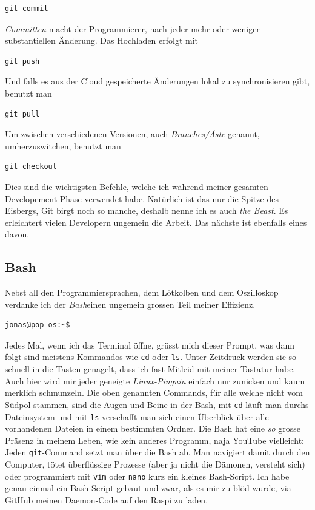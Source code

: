 \documentclass[12pt,titlepage,a4paper]{article}
\begin{document}
\begin{verbatim}
git commit 
\end{verbatim}
\textit{Committen} macht der Programmierer, nach jeder mehr oder weniger substantiellen Änderung. Das Hochladen erfolgt mit
\begin{verbatim}
git push
\end{verbatim}
Und falls es aus der Cloud gespeicherte Änderungen lokal zu synchronisieren gibt, benutzt man
\begin{verbatim}
git pull
\end{verbatim}
Um zwischen verschiedenen Versionen, auch \textit{Branches/Äste} genannt, umherzuswitchen, benutzt man
\begin{verbatim}
git checkout
\end{verbatim}
Dies sind die wichtigsten Befehle, welche ich während meiner gesamten Developement-Phase verwendet habe. Natürlich ist das nur die Spitze des Eisbergs, Git birgt noch so manche, deshalb nenne ich es auch \textit{the Beast}. Es erleichtert vielen Developern ungemein die Arbeit. Das nächste ist ebenfalls eines davon.

\subsection{Bash}
Nebst all den Programmiersprachen, dem Lötkolben und dem Oszilloskop verdanke ich der \textit{Bash}einen ungemein grossen Teil meiner Effizienz.
\begin{verbatim}
jonas@pop-os:~$
\end{verbatim}
Jedes Mal, wenn ich das Terminal öffne, grüsst mich dieser Prompt, was dann folgt sind meistens Kommandos wie \verb&cd& oder \verb&ls&. Unter Zeitdruck werden sie so schnell in die Tasten genagelt, dass ich fast Mitleid mit meiner Tastatur habe. Auch hier wird mir jeder geneigte \textit{Linux-Pinguin} einfach nur zunicken und kaum merklich schmunzeln. Die oben genannten Commands, für alle welche nicht vom Südpol stammen, sind die Augen und Beine in der Bash, mit \verb&cd& läuft man durchs Dateinsystem und mit \verb&ls& verschafft man sich einen Überblick über alle vorhandenen Dateien in einem bestimmten Ordner. Die Bash hat eine \textit{so} grosse Präsenz in meinem Leben, wie kein anderes Programm, naja YouTube vielleicht: Jeden \verb^git^-Command setzt man über die Bash ab. Man navigiert damit durch den Computer, tötet überflüssige Prozesse (aber ja nicht die Dämonen, versteht sich) oder programmiert mit \verb&vim& oder \verb$nano$ kurz ein kleines Bash-Script. Ich habe genau einmal ein Bash-Script gebaut und zwar, als es mir zu blöd wurde, via GitHub meinen Daemon-Code auf den Raspi zu laden.
\end{document}
